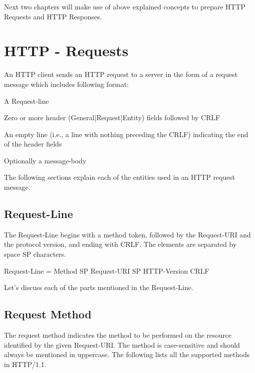 \documentclass[a4paper,11pt,bahasa]{extarticle}
\begin{document}
Next two chapters will make use of above explained concepts to prepare HTTP Requests and HTTP Responses.

\section{HTTP - Requests}

An HTTP client sends an HTTP request to a server in the form of a request message which includes 
following format:
\begin{textcode}
    A Request-line

    Zero or more header (General|Request|Entity) fields followed by CRLF

    An empty line (i.e., a line with nothing preceding the CRLF) 
    indicating the end of the header fields

    Optionally a message-body
\end{textcode}

The following sections explain each of the entities used in an HTTP request message.

\subsection{Request-Line}

The Request-Line begins with a method token, followed by the Request-URI and the protocol version, and 
ending with CRLF. The elements are separated by space SP characters.
\begin{textcode}
Request-Line = Method SP Request-URI SP HTTP-Version CRLF
\end{textcode}
Let's discuss each of the parts mentioned in the Request-Line.

\subsection{Request Method}

The request method indicates the method to be performed on the resource identified by the given 
Request-URI. The method is case-sensitive and should always be mentioned in uppercase. The following 
lists all the supported methods in HTTP/1.1.
\end{document}
